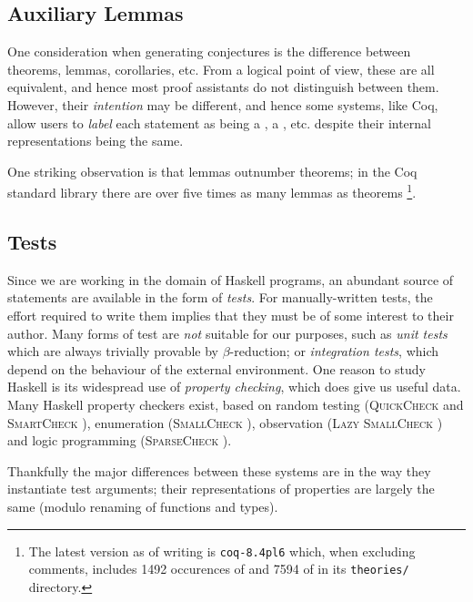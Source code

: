 \documentclass[]{article}
\begin{document}

\subsection{Auxiliary Lemmas}

One consideration when generating conjectures is the difference between theorems, lemmas, corollaries, etc. From a logical point of view, these are all equivalent, and hence most proof assistants do not distinguish between them. However, their \emph{intention} may be different, and hence some systems, like Coq, allow users to \emph{label} each statement as being a , a , etc. despite their internal representations being the same.

One striking observation is that lemmas outnumber theorems; in the Coq standard library there are over five times as many lemmas as theorems \footnote{The latest version as of writing is \texttt{coq-8.4pl6} which, when excluding comments, includes 1492 occurences of  and 7594 of  in its \texttt{theories/} directory.}.



\subsection{Tests}

Since we are working in the domain of Haskell programs, an abundant source of statements are available in the form of \emph{tests}. For manually-written tests, the effort required to write them implies that they must be of some interest to their author. Many forms of test are \emph{not} suitable for our purposes, such as \emph{unit tests} which are always trivially provable by $\beta$-reduction; or \emph{integration tests}, which depend on the behaviour of the external environment. One reason to study Haskell is its widespread use of \emph{property checking}, which does give us useful data. Many Haskell property checkers exist, based on random testing (\textsc{QuickCheck} \cite{claessen2011quickcheck} and \textsc{SmartCheck} \cite{pike2014smartcheck}), enumeration (\textsc{SmallCheck} \cite{runciman2008smallcheck}), observation (\textsc{Lazy SmallCheck} \cite{reich2013advances}) and logic programming (\textsc{SparseCheck} \cite{sparsecheck}).

Thankfully the major differences between these systems are in the way they instantiate test arguments; their representations of properties are largely the same (modulo renaming of functions and types).
\end{document}

